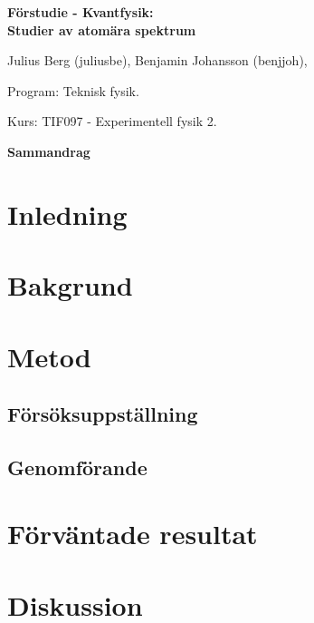 \documentclass[12pt, a4paper]{article}
\begin{document}
\thispagestyle{empty}
\begin{center}
{\huge\bf Förstudie - Kvantfysik:\\}
{\Large\bf Studier av atomära spektrum
}
\end{center}
\vspace{1.0cm}
\begin{center}
Julius Berg (juliusbe), Benjamin Johansson (benjjoh), \par
Program: Teknisk fysik. \par
Kurs: TIF097 - Experimentell fysik 2.
\end{center}
\vspace{1.0cm}
\centerline{\bf Sammandrag}
 
\newpage
\tableofcontents
\newpage

\section{Inledning}

\section{Bakgrund}

\section{Metod}

\subsection{Försöksuppställning}

\subsection{Genomförande}

\section{Förväntade resultat}

\section{Diskussion}

\newpage
\end{document}
